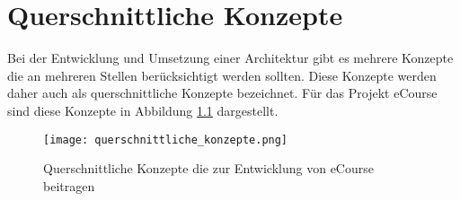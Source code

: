 \chapter{Querschnittliche Konzepte}
\label{sec:quer}

Bei der Entwicklung und Umsetzung einer Architektur gibt es mehrere Konzepte die an mehreren Stellen berücksichtigt werden sollten. Diese Konzepte werden daher auch als querschnittliche Konzepte bezeichnet. Für das Projekt eCourse sind diese Konzepte in Abbildung \ref{fib:querschnitt} dargestellt.


\begin{landscape}
\begin{figure}[H]
\centering
\texttt{[image: querschnittliche\_konzepte.png]}
\caption{Querschnittliche Konzepte die zur Entwicklung von eCourse beitragen}
\label{fib:querschnitt}
\end{figure}
\end{landscape}
